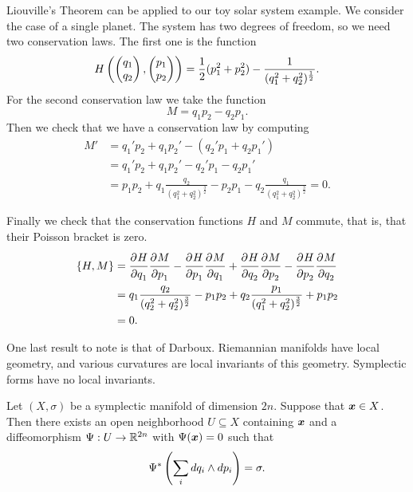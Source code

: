 \documentclass[twoside,letterpaper,11pt]{article}
\numberwithin{equation}{section}
\begin{document}
Liouville's Theorem can be applied to our toy solar system example.
We consider the case of a single planet.
The system has two degrees of freedom, so we need two conservation laws.
The first one is the function
\begin{equation*}
  H \left( \pt{q_1\\q_2}, \pt{p_1\\p_2} \right) = \frac{1}{2}(p_1^2 + p_2^2) -
  \frac{1}{(q_1^2 + q_2^2)^{\frac{1}{2}}}.
\end{equation*}
For the second conservation law we take the function
\begin{equation*}
  M = q_1 p_2 - q_2 p_1.
\end{equation*}
Then we check that we have a conservation law by computing
\begin{align*}
  M' &= q_1' p_2 + q_1 p_2' - \left( q_2' p_1 + q_2 p_1' \right)\\
     &= q_1' p_2 + q_1 p_2' - q_2' p_1 - q_2 p_1'\\
     &= p_1 p_2 + q_1 \frac{q_2}{(q_1^2 + q_2^2)^{\frac{3}{2}}} - p_2 p_1 - q_2
       \frac{q_1}{(q_1^2 + q_2^2)^{\frac{3}{2}}} = 0.
\end{align*}

Finally we check that the conservation functions $H$ and $M$ commute, that is,
that their Poisson bracket is zero.
\begin{align*}
  \{H, M\} &= \frac{\strut\partial^{}H}{\strut\partial q_1^{}} \frac{\strut\partial^{}M}{\strut\partial p_1^{}} - \frac{\strut\partial^{}H}{\strut\partial p_1^{}} \frac{\strut\partial^{}M}{\strut\partial q_1^{}} + \frac{\strut\partial^{}H}{\strut\partial q_2^{}}
             \frac{\strut\partial^{}M}{\strut\partial p_2^{}} - \frac{\strut\partial^{}H}{\strut\partial p_2^{}} \frac{\strut\partial^{}M}{\strut\partial q_2^{}}\\
  &= q_1\frac{q_2}{(q_2^2 + q_2^2)^{\frac{3}{2}}} - p_1 p_2 + q_2
    \frac{p_1}{(q_1^2 + q_2^2)^{\frac{3}{2}}} + p_1 p_2\\
  &= 0.
\end{align*}

One last result to note is that of Darboux.
Riemannian manifolds have local geometry, and various curvatures are local
invariants of this geometry.
Symplectic forms have no local invariants.
\begin{thm}
  Let $(X, \sigma)$ be a symplectic manifold of dimension $2n$.
  Suppose that $\bm{x} \in X$.
  Then there exists an open neighborhood $U \subseteq X$ containing $\bm{x}$ and
  a diffeomorphism $\Psi : U \to \mathbb{R}^{2n}$ with $\Psi(\bm{x}) = 0$ such that
  \begin{equation*}
    \Psi^* \left( \sum_{i} \mathop{}\!d q_i \wedge \mathop{}\!d p_i \right) = \sigma.
  \end{equation*}
\end{thm}
\end{document}

